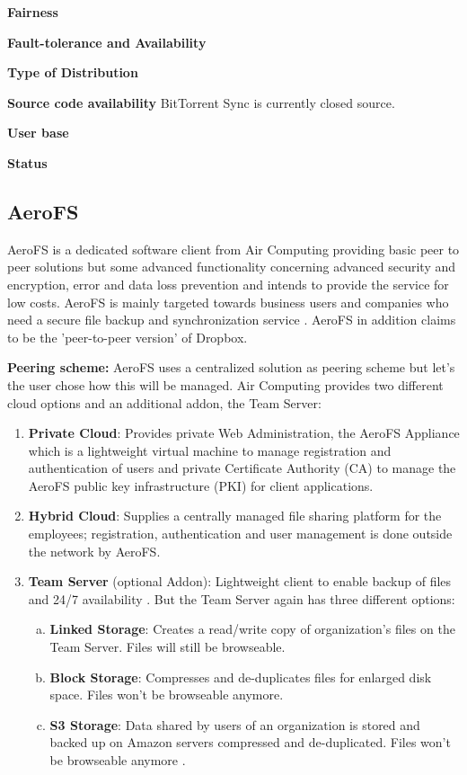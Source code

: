 \textbf{Fairness}

\textbf{Fault-tolerance and Availability}

\textbf{Type of Distribution}

\textbf{Source code availability}
BitTorrent Sync is currently closed source.

\textbf{User base}

\textbf{Status}

\subsection{AeroFS} %
AeroFS is a dedicated software client from Air Computing providing basic peer to peer solutions but some advanced functionality concerning advanced security and encryption, error and data loss prevention and intends to provide the service for low costs. AeroFS is mainly targeted towards business users and companies who need a secure file backup and synchronization service \cite{aerofs}. AeroFS in addition claims to be the 'peer-to-peer version' of Dropbox.

\textbf{Peering scheme:} AeroFS uses a centralized solution as peering scheme but let's the user chose how this will be managed. Air Computing provides two different cloud options and an additional addon, the Team Server:

\begin{enumerate}
\item \textbf{Private Cloud}: Provides private Web Administration, the AeroFS Appliance which is a lightweight virtual machine to manage registration and authentication of users and private Certificate Authority (CA) to manage the AeroFS public key infrastructure (PKI) for client applications.
\item \textbf{Hybrid Cloud}: Supplies a centrally managed file sharing platform for the employees; registration, authentication and user management is done outside the network by AeroFS.
\item \textbf{Team Server} (optional Addon): Lightweight client to enable backup of files and 24/7 availability \cite{aerofs:cloud_types}. But the Team Server again has three different options:
	\begin{enumerate}[(a)]
	\item \textbf{Linked Storage}: Creates a read/write copy of organization's files on the Team Server. Files will still be browseable.
	\item \textbf{Block Storage}: Compresses and de-duplicates files for enlarged disk space. Files won't be browseable anymore.
	\item \textbf{S3 Storage}: Data shared by users of an organization is stored and backed up on Amazon servers compressed and de-duplicated. Files won't be browseable anymore \cite{aerofs:storage_types}.
	\end{enumerate}
\end{enumerate}

